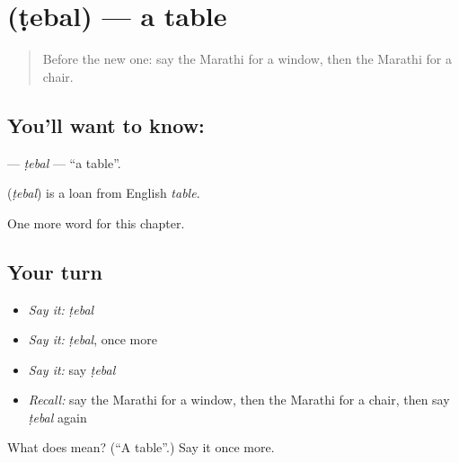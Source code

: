 \section[\texorpdfstring{\mr{टेबल} (ṭebal)}{टेबल (ṭebal)}]{ (ṭebal) — a table}

\label{lesson:MR-C89-tebal}



\begin{quote}
Before the new one: say the Marathi for a window, then the Marathi for a chair.
\end{quote}

\subsection*{You'll want to know: }
\textbf{} — \emph{ṭebal} — \textquotedblleft{}a table\textquotedblright{}.

\begin{cousinweb}
\textbf{} (\emph{ṭebal}) is a loan from English \emph{table}.
\end{cousinweb}

\begin{grammarlens}[title={What you've built}]
One more word for this chapter.
\end{grammarlens}

\subsection*{Your turn}
\begin{itemize}
\raggedright
  \item \emph{Say it:} \emph{ṭebal}
  \item \emph{Say it:} \emph{ṭebal}, once more
  \item \emph{Say it:} say \emph{ṭebal}
  \item \emph{Recall:} say the Marathi for a window, then the Marathi for a chair, then say \emph{ṭebal} again
\end{itemize}

\begin{tcolorbox}[breakable,colback=teal!4,colframe=teal!35!black,title={Before you move on}]
What does  mean? (\textquotedblleft{}A table\textquotedblright{}.) Say it once more.
\end{tcolorbox}

